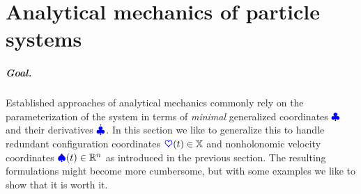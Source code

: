 \chapter{Analytical mechanics of particle systems}
\paragraph{Goal.}
Established approaches of analytical mechanics commonly rely on the parameterization of the system in terms of \textit{minimal} generalized coordinates $\boldsymbol{\textcolor{blue}{\clubsuit}}$ and their derivatives $\dot{\boldsymbol{\textcolor{blue}{\clubsuit}}}$.
In this section we like to generalize this to handle redundant configuration coordinates $\boldsymbol{\textcolor{blue}{\heartsuit}}(t) \in \mathbb{X}$ and nonholonomic velocity coordinates $\boldsymbol{\textcolor{blue}{\spadesuit}}(t)\in\mathbb{R}^n$ as introduced in the previous section.
The resulting formulations might become more cumbersome, but with some examples we like to show that it is worth it.

